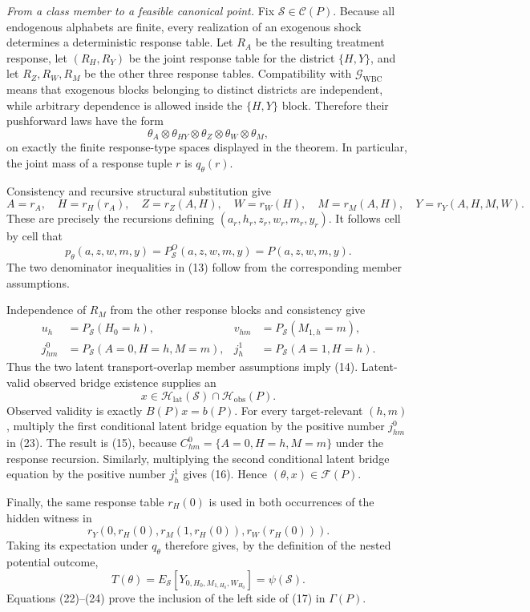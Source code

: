 \emph{From a class member to a feasible canonical point.}
Fix \(\mathcal S\in\mathcal C(P)\).  Because all endogenous alphabets are
finite, every realization of an exogenous shock determines a deterministic
response table.  Let \(R_A\) be the resulting treatment response, let
\((R_H,R_Y)\) be the joint response table for the district \(\{H,Y\}\),
and let \(R_Z,R_W,R_M\) be the other three response tables.  Compatibility
with \(\mathcal G_{\mathrm{WBC}}\) means that exogenous blocks belonging to
distinct districts are independent, while arbitrary dependence is allowed
inside the \(\{H,Y\}\) block.  Therefore their pushforward laws have the
form
\[
 \theta_A\otimes\theta_{HY}\otimes\theta_Z\otimes\theta_W
 \otimes\theta_M,
\]
on exactly the finite response-type spaces displayed in the theorem.  In
particular, the joint mass of a response tuple \(r\) is \(q_\theta(r)\).

Consistency and recursive structural substitution give
\[
 A=r_A,\quad H=r_H(r_A),\quad Z=r_Z(A,H),\quad W=r_W(H),\quad
 M=r_M(A,H),\quad Y=r_Y(A,H,M,W).
\]
These are precisely the recursions defining
\((a_r,h_r,z_r,w_r,m_r,y_r)\).  It follows cell by cell that
\[
 p_\theta(a,z,w,m,y)=P_{\mathcal S}^O(a,z,w,m,y)=P(a,z,w,m,y).
 \tag{22}
\]
The two denominator inequalities in (13) follow from the corresponding
member assumptions.

Independence of \(R_M\) from the other response blocks and consistency give
\[
\begin{aligned}
 u_h&=P_{\mathcal S}(H_0=h),&
 v_{hm}&=P_{\mathcal S}(M_{1,h}=m),\\
 j^0_{hm}&=P_{\mathcal S}(A=0,H=h,M=m),&
 j^1_h&=P_{\mathcal S}(A=1,H=h).
\end{aligned}
 \tag{23}
\]
Thus the two latent transport-overlap member assumptions imply (14).
Latent-valid observed bridge existence supplies an
\[
 x\in\mathcal H_{\mathrm{lat}}(\mathcal S)
      \cap\mathcal H_{\mathrm{obs}}(P).
\]
Observed validity is exactly \(B(P)x=b(P)\).  For every target-relevant
\((h,m)\), multiply the first conditional latent bridge equation by the
positive number \(j^0_{hm}\) in (23).  The result is (15), because
\(C^0_{hm}=\{A=0,H=h,M=m\}\) under the response recursion.  Similarly,
multiplying the second conditional latent bridge equation by the positive
number \(j^1_h\) gives (16).  Hence \((\theta,x)\in\mathcal F(P)\).

Finally, the same response table \(r_H(0)\) is used in both occurrences of
the hidden witness in
\[
 r_Y\!\left(0,r_H(0),r_M(1,r_H(0)),r_W(r_H(0))\right).
\]
Taking its expectation under \(q_\theta\) therefore gives, by the definition
of the nested potential outcome,
\[
 T(\theta)=E_{\mathcal S}
 [Y_{0,H_0,M_{1,H_0},W_{H_0}}]=\psi(\mathcal S).
 \tag{24}
\]
Equations (22)--(24) prove the inclusion of the left side of (17) in
\(\Gamma(P)\).

